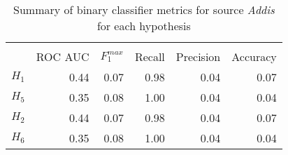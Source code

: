 \begin{table}[htbp!] \centering
\caption{Summary of binary classifier metrics for source \textit{Addis} for each hypothesis}
\label{tab:431_metrics_summary_Addis}
\begin{tabular}{lrrrrr}
\\[-1.8ex]\hline\hline \\[-1.8ex]
 & ROC AUC & $F_1^{max}$ & Recall & Precision & Accuracy \\
\midrule
$H_1$ & 0.44 & 0.07 & 0.98 & 0.04 & 0.07 \\
$H_5$ & 0.35 & 0.08 & 1.00 & 0.04 & 0.04 \\
$H_2$ & 0.44 & 0.07 & 0.98 & 0.04 & 0.07 \\
$H_6$ & 0.35 & 0.08 & 1.00 & 0.04 & 0.04 \\
\bottomrule
\end{tabular}
\end{table}
